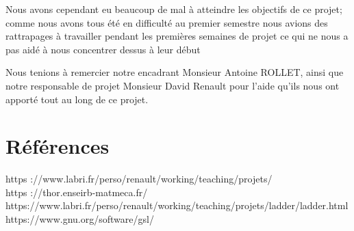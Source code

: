 \documentclass[a4paper,10pt]{article}
\begin{document}
Nous avons cependant eu beaucoup de mal à atteindre les objectifs de ce projet; comme nous avons tous été en difficulté au premier semestre nous avions des rattrapages à travailler pendant les premières semaines de projet ce qui ne nous a pas aidé à nous concentrer dessus à leur début
\newline

Nous tenions à remercier notre encadrant  Monsieur Antoine ROLLET, ainsi que notre responsable de projet Monsieur David Renault pour l'aide qu'ils nous ont apporté tout au long de ce projet.




\section{Références}

https ://www.labri.fr/perso/renault/working/teaching/projets/
\\
\indent https ://thor.enseirb-matmeca.fr/
\\
\indent https://www.labri.fr/perso/renault/working/teaching/projets/ladder/ladder.html
\\
\indent https://www.gnu.org/software/gsl/
\\
\end{document}
